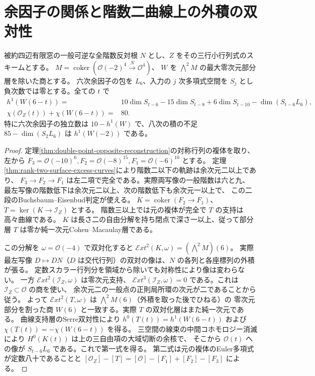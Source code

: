 \section{余因子の関係と階数二曲線上の外積の双対性}
\label{sec:cofactor-curve-duality}
\begin{theorem}\label{thm:cofactor-curve-duality}
被約四辺有限窓の一般可逆な全階数反対根 $N$ とし、$Z$ をその三行小行列式のスキームとする。
$M=\operatorname{coker}(\mathcal O(-2)^4\xrightarrow{N}\mathcal O^4)$、
$W$ を $\bigwedge^2 M$ の最大零次元部分層を除いた商とする。
六次余因子の包を $L_6$、入力の $j$ 次多項式空間を $S_j$ とし負次数では零とする。全ての $t$ で
\[
 \begin{split}
 h^1(W(6-t))={}&10\dim S_{t-6}-15\dim S_{t-8}+6\dim S_{t-10}
                         -\dim(S_{t-6}L_6),\\
 \chi(\mathcal O_Z(t))+\chi(W(6-t))={}&80 .
 \end{split}
\]
特に六次余因子の独立数は $10-h^1(W)$ で、八次の積の不足 $85-\dim(S_2L_6)$ は $h^1(W(-2))$ である。
\end{theorem}
\begin{proof}
定理\ref{thm:double-point-opposite-reconstruction}の対称行列の複体を取り、
左から $F_3=\mathcal O(-10)^6,F_2=\mathcal O(-8)^{15},F_1=\mathcal O(-6)^{10}$ とする。
定理\ref{thm:rank-two-surface-excess-curves}により階数二以下の軌跡は余次元二以上であり、
$F_3\to F_2\to F_1$ は左二項で完全である。実際両写像の一般階数は六と九、
最左写像の階数低下は余次元二以上、次の階数低下も余次元一以上で、
この二段のBuchsbaum--Eisenbud判定が使える。
$K=\operatorname{coker}(F_2\to F_1)$、$T=\ker(K\to\mathcal I_Z)$ とする。
階数三以上では元の複体が完全で $T$ の支持は高々曲線である。
$K$ は長さ二の自由分解を持ち閉点で深さ一以上、従って部分層 $T$ は零か純一次元Cohen--Macaulay層である。

この分解を $\omega=\mathcal O(-4)$ で双対化すると
$\mathcal Ext^2(K,\omega)=(\bigwedge^2 M)(6)$。
実際最左写像 $D\mapsto DN$（$D$ は交代行列）の双対の像は、$N$ の各列と各座標列の外積が張る。
定数スカラー行列分を領域から除いても対称性により像は変わらない。
一方 $\mathcal Ext^2(\mathcal I_Z,\omega)$ は零次元支持、
$\mathcal Ext^3(\mathcal I_Z,\omega)=0$ である。これは $\mathcal I_Z\subset\mathcal O$ の商を使い、
余次元二の一般点の正則局所環の次元が二であることから従う。
よって $\mathcal Ext^2(T,\omega)$ は $\bigwedge^2 M(6)$（外積を取った後でひねる）の
零次元部分を割った商 $W(6)$ と一致する。実際 $T$ の双対化層はまた純一次元である。
曲線支持層のSerre双対性により $h^0(T(t))=h^1(W(6-t))$ および
$\chi(T(t))=-\chi(W(6-t))$ を得る。
三空間の線束の中間コホモロジー消滅により $H^0(K(t))$ は上の三自由項の大域切断の余核で、
そこから $\mathcal O(t)$ への像が $S_{t-6}L_6$ である。これで第一式を得る。
第二式は元の複体のEuler多項式が定数八十であることと
$[\mathcal O_Z]-[T]=[\mathcal O]-[F_1]+[F_2]-[F_3]$ による。
\end{proof}

